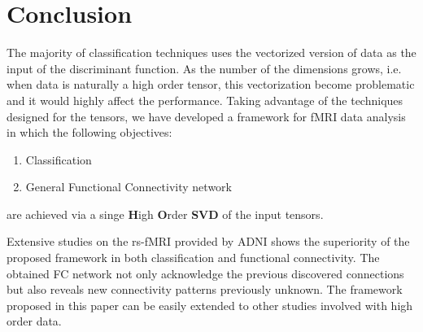 \documentclass[preprint,12pt]{elsarticle}
\begin{document}






\section{Conclusion}
The majority of classification techniques uses the vectorized version of data as the input of the discriminant function. As the number of the dimensions grows, i.e. when data is naturally a high order tensor, this vectorization become problematic and it would highly affect the  performance. Taking advantage of the techniques designed for the tensors, we have developed a framework for fMRI data analysis in which the following objectives: 
\begin{enumerate}
	\item 
	Classification 
	\item 
	General Functional Connectivity network
\end{enumerate}
are achieved via a singe \textbf{H}igh \textbf{O}rder \textbf{SVD} of the input tensors. 

Extensive studies on the rs-fMRI provided by ADNI shows the superiority of the proposed framework in both classification and functional connectivity. The obtained FC network not only acknowledge the previous discovered connections but also reveals new connectivity patterns previously unknown.
The framework proposed in this paper can be easily extended to other studies involved with high order data.  
\end{document}
